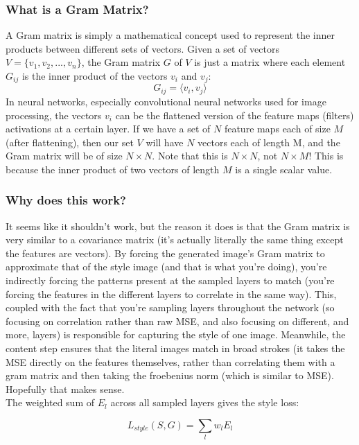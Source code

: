 \documentclass[12pt]{article}
\begin{document}
\subsubsection{What is a Gram Matrix?}
A Gram matrix is simply a mathematical concept used to represent the inner products between different sets of vectors. Given a set of vectors \(V = \{v_1, v_2, ..., v_n\}\), the Gram matrix \(G\) of \(V\) is just a matrix where each element \(G_{ij}\) is the inner product of the vectors \(v_i\) and \(v_j\):
\[G_{ij} = \langle v_i, v_j \rangle \]
In neural networks, especially convolutional neural networks used for image processing, the vectors \(v_i\) can be the flattened version of the feature maps (filters) activations at a certain layer. If we have a set of  \(N\) feature maps each of size \(M\) (after flattening), then our set \(V\) will have \(N\) vectors each of length M, and the Gram matrix will be of size \(N \times N\). Note that this is \(N \times N\), not \(N \times M\)! This is because the inner product of two vectors of length \(M\) is a single scalar value.
\subsubsection{Why does this work?}
It seems like it shouldn't work, but the reason it does is that the Gram matrix is very similar to a covariance matrix (it's actually literally the same thing except the features are vectors). By forcing the generated image's Gram matrix to approximate that of the style image (and that is what you're doing), you're indirectly forcing the patterns present at the sampled layers to match (you're forcing the features in the different layers to correlate in the same way). This, coupled with the fact that you're sampling layers throughout the network (so focusing on correlation rather than raw MSE, and also focusing on different, and more, layers) is responsible for capturing the style of one image.  Meanwhile, the content step ensures that the literal images match in broad strokes (it takes the MSE directly on the features themselves, rather than correlating them with a gram matrix and then taking the froebenius norm (which is similar to MSE). Hopefully that makes sense.\\

The weighted sum of \(E_l\) across all sampled layers gives the style loss:

\begin{equation}
    L_{style}(S, G) = \sum_{l} w_l E_l
\end{equation}
\end{document}
